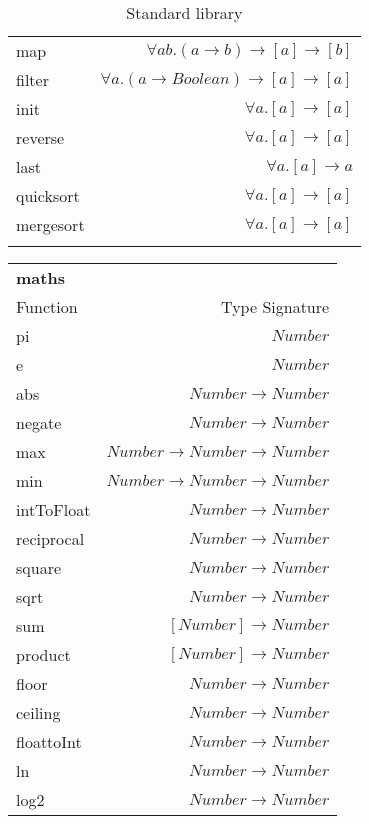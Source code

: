 \begin{longtable}{l r}
    map & $\forall a b. (a \rightarrow b) \rightarrow [a] \rightarrow [b]$ \\
    filter & $\forall a. (a \rightarrow Boolean) \rightarrow [a] \rightarrow [a] $\\
    init & $\forall a. [a] \rightarrow [a]$ \\
    reverse & $\forall a. [a] \rightarrow [a]$ \\
    last & $\forall a. [a] \rightarrow a$ \\
    quicksort & $\forall a. [a] \rightarrow [a]$ \\
    mergesort & $\forall a. [a] \rightarrow [a]$ \\
    \caption{Standard library}
\label{table:standard}
\end{longtable}

\begin{table}
    \begin{tabular}{l r}
    \rowcolor{light-gray}
        \textbf{maths} & \\
        Function & Type Signature \\
        \hline
        pi & $Number$ \\
        e & $Number$ \\
        abs & $Number \rightarrow Number$ \\
        negate & $Number \rightarrow Number$ \\
        max & $Number \rightarrow Number \rightarrow Number$ \\
        min & $Number \rightarrow Number \rightarrow Number$ \\
        intToFloat & $Number \rightarrow Number$ \\
        reciprocal & $Number \rightarrow Number$ \\
        square & $Number \rightarrow Number$ \\
        sqrt & $Number \rightarrow Number$ \\
        sum & $[Number] \rightarrow Number$ \\
        product & $[Number] \rightarrow Number$ \\
        floor & $Number \rightarrow Number$ \\
        ceiling & $Number \rightarrow Number$ \\
        floattoInt & $Number \rightarrow Number$ \\
        ln & $Number \rightarrow Number$ \\
        log2 & $Number \rightarrow Number$ \\

\end{tabular}
\end{table}
